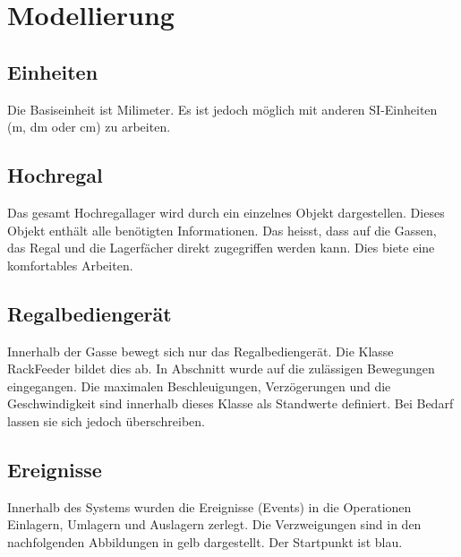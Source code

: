 \section{Modellierung}


\subsection{Einheiten}
Die Basiseinheit ist Milimeter. Es ist jedoch möglich mit anderen SI-Einheiten (m, dm oder cm) zu arbeiten.
%
\subsection{Hochregal}
Das gesamt Hochregallager wird durch ein einzelnes Objekt dargestellen. Dieses Objekt enthält alle benötigten Informationen. Das heisst, dass auf die Gassen, das Regal und die Lagerfächer direkt zugegriffen werden kann. Dies biete eine komfortables Arbeiten. 

%
\subsection{Regalbediengerät}
Innerhalb der Gasse bewegt sich nur das Regalbediengerät. Die Klasse RackFeeder bildet dies ab. In Abschnitt wurde auf die zulässigen Bewegungen eingegangen. Die maximalen Beschleuigungen, Verzögerungen und die Geschwindigkeit sind innerhalb dieses Klasse als Standwerte definiert. Bei Bedarf lassen sie sich jedoch überschreiben.
%
\subsection{Ereignisse}
Innerhalb des Systems wurden die Ereignisse (Events) in die Operationen Einlagern, Umlagern und Auslagern zerlegt. Die Verzweigungen sind in den nachfolgenden Abbildungen in gelb dargestellt. Der Startpunkt ist blau. 

